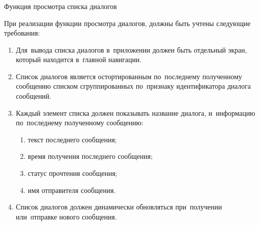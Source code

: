\subsubsection{} Функция просмотра списка диалогов
\label{sec:analysis:research:funcreq:dialogueslist}

При реализации функции просмотра диалогов, должны быть учтены следующие требования:

\begin{enumerate}
	\item Для~вывода списка диалогов в~приложении должен быть отдельный экран, который находится в~главной навигации.
	\item Список диалогов является остортированным по~последнему полученному сообщению списком сгруппированных по~признаку идентификатора диалога сообщений.
	\item Каждый элемент списка должен показывать название диалога, и~информацию по~последнему полученному сообщению:
	\begin{enumerate}
		\item текст последнего сообщения;
		\item время получения последнего сообщения;
		\item статус прочтения сообщения;
		\item имя отправителя сообщения.
	\end{enumerate}
	\item Список диалогов должен динамически обновляться при~получении или~отправке нового сообщения.
\end{enumerate}
